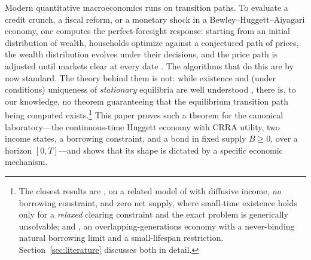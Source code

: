 \documentclass[11pt]{article}
\theoremstyle{definition}
\theoremstyle{remark}
\begin{document}
Modern quantitative macroeconomics runs on transition paths. To
evaluate a credit crunch, a fiscal reform, or a monetary shock in a
Bewley--Huggett--Aiyagari economy, one computes the perfect-foresight
response: starting from an initial distribution of wealth, households
optimize against a conjectured path of prices, the wealth distribution
evolves under their decisions, and the price path is adjusted until
markets clear at every date \citep{KMV2018,BoppartKrusellMitman2018,
AuclertEtAl2021,AHLLM2022}. The algorithms that do this are by now
standard. The theory behind them is not: while existence and (under
conditions) uniqueness of \emph{stationary} equilibria are well
understood \citep{Aiyagari1994,Acikgoz2018,AHLLM2022,Hofer2025}, there
is, to our knowledge, no theorem guaranteeing that the equilibrium
transition path being computed exists.\footnote{The closest results
are \cite{Ambrose2021}, on a related model of \cite{ABLLM2014} with
diffusive income, \emph{no} borrowing constraint, and zero net supply,
where small-time existence holds only for a \emph{relaxed} clearing
constraint and the exact problem is generically unsolvable; and
\cite{ChenEtAl2025}, an overlapping-generations economy with a
never-binding natural borrowing limit and a small-lifespan
restriction. Section~\ref{sec:literature} discusses both in detail.}
This paper proves such a theorem for the canonical laboratory---the
continuous-time Huggett economy with CRRA utility, two income states,
a borrowing constraint, and a bond in fixed supply $B\ge0$, over a
horizon $[0,T]$---and shows that its shape is dictated by a specific
economic mechanism.
\end{document}
